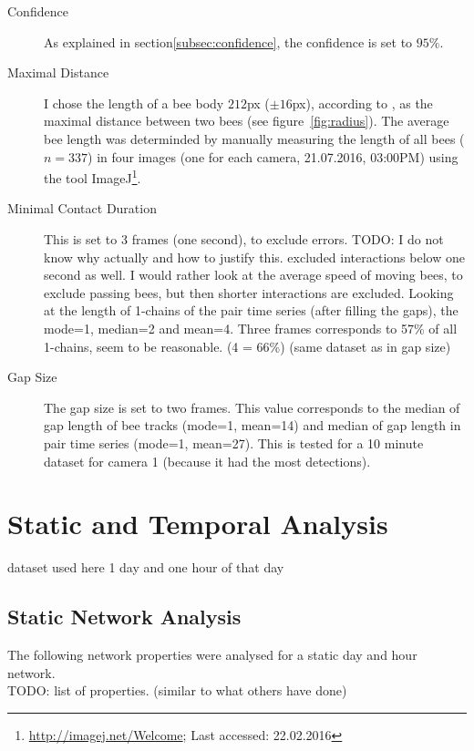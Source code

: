 \begin{description}
\item[Confidence] As explained in section\ref{subsec:confidence}, the confidence is set to $95\%$.

\item[Maximal Distance] I chose the length of a bee body $212$px ($\pm 16$px), according to \textcite{baracchi2014socio}, as the maximal distance between two bees (see figure~\ref{fig:radius}). The average bee length was determinded by manually measuring the length of all bees ($n=337$) in four images (one for each camera, 21.07.2016, 03:00PM) using the tool ImageJ\footnote{\url{http://imagej.net/Welcome}; Last accessed: 22.02.2016}.

\item[Minimal Contact Duration] This is set to 3 frames (one second), to exclude errors. TODO: I do not know why actually and how to justify this. \textcite{mersch2013tracking} excluded interactions below one second as well. I would rather look at the average speed of moving bees, to exclude passing bees, but then shorter interactions are excluded. Looking at the length of 1-chains of the pair time series (after filling the gaps), the mode=1, median=2 and mean=4. Three frames corresponds to 57\% of all 1-chains, seem to be reasonable. (4 = 66\%) (same dataset as in gap size)

\item[Gap Size] The gap size is set to two frames. This value corresponds to the median of gap length of bee tracks (mode=1, mean=14) and median of gap length in pair time series (mode=1, mean=27). This is tested for a 10 minute dataset for camera 1 (because it  had the most detections).
\end{description}


\section{Static and Temporal Analysis}
dataset used here 1 day and one hour of that day\\

\subsection{Static Network Analysis}
The following network properties were analysed for a static day and hour network.\\
TODO: list of properties. (similar to what others have done)

